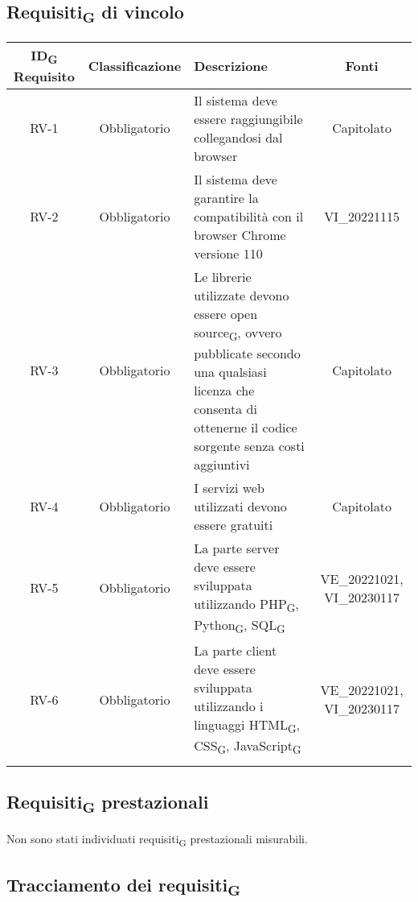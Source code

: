 \subsection{Requisiti\textsubscript{G} di vincolo}
\setlength\extrarowheight{3pt}
\begin{tabularx}{\textwidth}{| c | c | X | c |} 
 \hline
 \rowcolor{white}
 \textbf{ID\textsubscript{G} Requisito} & \textbf{Classificazione} & \textbf{Descrizione} & \textbf{Fonti} \\
 \hline
 RV-1 & Obbligatorio &  Il sistema deve essere raggiungibile collegandosi dal browser & Capitolato\\
 \hline
  RV-2 & Obbligatorio & Il sistema deve garantire la compatibilità con il browser Chrome versione 110 & VI\_20221115\\
 \hline
 RV-3 & Obbligatorio &  Le librerie utilizzate devono essere open source\textsubscript{G}, ovvero pubblicate secondo una qualsiasi licenza che consenta di ottenerne il codice sorgente senza costi aggiuntivi & Capitolato\\
 \hline
 RV-4 & Obbligatorio & I servizi web utilizzati devono essere gratuiti &  Capitolato\\
 \hline
 RV-5 & Obbligatorio & La parte server deve essere sviluppata utilizzando PHP\textsubscript{G}, Python\textsubscript{G}, SQL\textsubscript{G} & VE\_20221021, VI\_20230117\\
 \hline
 RV-6 & Obbligatorio & La parte client deve essere sviluppata utilizzando i linguaggi HTML\textsubscript{G}, CSS\textsubscript{G}, JavaScript\textsubscript{G} & VE\_20221021, VI\_20230117\\
 \hline
 \rowcolor{white}
 \caption{Requisiti\textsubscript{G} di vincolo}
\end{tabularx}

\subsection{Requisiti\textsubscript{G} prestazionali}
Non sono stati individuati requisiti\textsubscript{G} prestazionali misurabili.
\subsection{Tracciamento dei requisiti\textsubscript{G}}
